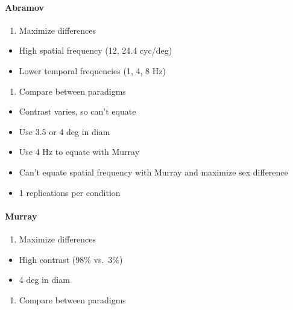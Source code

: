 \documentclass[]{article}
\providecommand{\tightlist}{%
  \setlength{\itemsep}{0pt}\setlength{\parskip}{0pt}}
\let\oldparagraph\paragraph
\renewcommand{\paragraph}[1]{\oldparagraph{#1}\mbox{}}
\begin{document}
\hypertarget{abramov}{%
\paragraph{Abramov}\label{abramov}}

\begin{enumerate}
\def\labelenumi{\arabic{enumi}.}
\tightlist
\item
  Maximize differences
\end{enumerate}

\begin{itemize}
\tightlist
\item
  High spatial frequency (12, 24.4 cyc/deg)
\item
  Lower temporal frequencies (1, 4, 8 Hz)
\end{itemize}

\begin{enumerate}
\def\labelenumi{\arabic{enumi}.}
\setcounter{enumi}{2}
\tightlist
\item
  Compare between paradigms
\end{enumerate}

\begin{itemize}
\tightlist
\item
  Contrast varies, so can't equate
\item
  Use 3.5 or 4 deg in diam
\item
  Use 4 Hz to equate with Murray
\item
  Can't equate spatial frequency with Murray and maximize sex difference
\item
  1 replications per condition
\end{itemize}

\hypertarget{murray}{%
\paragraph{Murray}\label{murray}}

\begin{enumerate}
\def\labelenumi{\arabic{enumi}.}
\tightlist
\item
  Maximize differences
\end{enumerate}

\begin{itemize}
\tightlist
\item
  High contrast (98\% vs.~3\%)
\item
  4 deg in diam
\end{itemize}

\begin{enumerate}
\def\labelenumi{\arabic{enumi}.}
\setcounter{enumi}{2}
\tightlist
\item
  Compare between paradigms
\end{enumerate}
\end{document}
